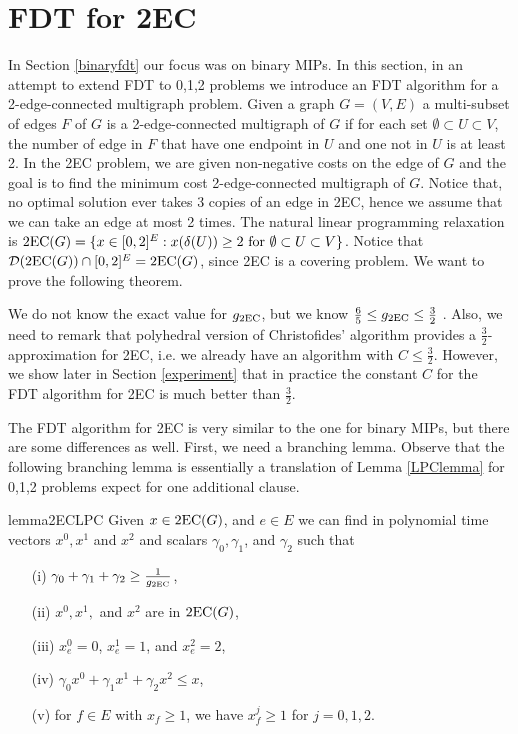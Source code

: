 \section{FDT for 2EC}\label{2EC}

In Section \ref{binaryfdt} our focus was on binary MIPs. In this section, in an attempt to extend FDT to 0,1,2 problems we introduce an FDT algorithm for a 2-edge-connected multigraph problem. Given a graph $G=(V,E)$ a multi-subset of edges $F$ of $G$ is a 2-edge-connected multigraph of $G$ if for each set $\emptyset\subset U \subset V$, the number of edge in $F$ that have one endpoint in $U$ and one not in $U$ is at least 2. In the 2EC problem, we are given non-negative costs on the edge of $G$ and the goal is to find the minimum cost 2-edge-connected multigraph of $G$. Notice that, no optimal solution ever takes 3 copies of an edge in 2EC, hence we assume that we can take an edge at most 2 times. The natural linear programming relaxation is $\operatorname{2EC}(G) = \{x\in [0,2]^E: x(\delta(U))\geq 2 \mbox{ for } \emptyset \subset U \subset V\}$. Notice that $\operatorname{\mathcal{D}}(\operatorname{2EC}(G))\cap [0,2]^{E} = \operatorname{2EC}(G)$, since 2EC is a covering problem. We want to prove the following theorem. 

\FDTEC*

We do not know the exact value for $g_{\operatorname{2EC}}$, but we know $\frac{6}{5} \leq g_{\operatorname{2EC}} \leq \frac{3}{2}$ \cite{carr-ravi,Wolsey1980}. Also, we need to remark that polyhedral version of Christofides' algorithm provides a $\frac{3}{2}$-approximation for 2EC, i.e. we already have an algorithm with $C\leq \frac{3}{2}$. However, we show later in Section \ref{experiment} that in practice the constant $C$ for the FDT algorithm for 2EC is much better than $\frac{3}{2}$. 

The FDT algorithm for 2EC is very similar to the one for binary MIPs, but there are some differences as well. First, we need a branching lemma. Observe that  the following branching lemma is essentially a translation of Lemma \ref{LPClemma} for 0,1,2 problems expect for one additional clause. 


\begin{restatable}{lemma}{2ECLPC}
	\label{LPC2EC}
		Given $x\in \operatorname{2EC}(G)$, and $e\in E$ we can find in polynomial time vectors $x^0,x^1$ and $x^2$ and scalars $\gamma_0,\gamma_1$, and $\gamma_2$ such that
	\begin{itemize}
		\item[(i)] $\gamma_0 + \gamma_1 +\gamma_2 \geq \frac{ 1}{g_{\operatorname{2EC}}}$,
		\item[(ii)] $x^0,x^1,$ and $x^2$ are in  $ \operatorname{2EC}(G)$, 
		\item[(iii)] $x^0_e=0$, $x^1_e=1$, and $x^2_e=2$,
		\item[(iv)] $\gamma_0 x^0 + \gamma_1{x}^1  + \gamma_2x^2\leq {x}$,
		\item[(v)] for $f\in E$ with ${x}_f\geq 1$, we have $x^j_f\geq 1$ for $j=0,1,2$. 
	\end{itemize}
\end{restatable}

